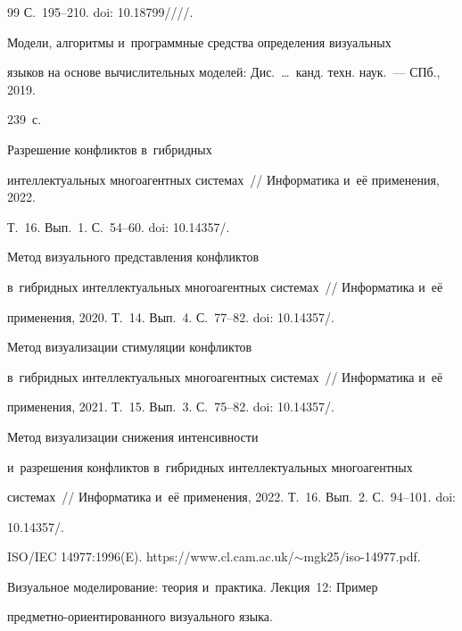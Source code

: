 {{\begin{thebibliography}{99}
С.~195--210. doi: 10.18799\!/\!/\!/\!/.




 Модели, алгоритмы и~программные средства определения визуальных 

языков на основе вычислительных моделей: Дис.\ \ldots\ канд. техн. наук.~--- СПб., 2019. 

239~с.


 Разрешение конфликтов в~гибридных 

интеллектуальных многоагентных системах~/\!\!/ Информатика и~её применения, 2022. 

Т.~16. Вып.~1. С.~54--60. doi: 10.14357\!/.


 Метод визуального представления конфликтов 

в~гибридных интеллектуальных многоагентных сис\-те\-мах~/\!\!/ Информатика и~её 

применения, 2020. Т.~14. Вып.~4. С.~77--82. doi: 10.14357\!/.


 Метод визуализации стимуляции конфликтов  

в~гиб\-рид\-ных интеллектуальных многоагентных сис\-те\-мах~/\!\!/ Информатика и~её 

применения, 2021. Т.~15. Вып.~3. С.~75--82. doi: 10.14357\!/.


 Метод визуализации снижения интенсивности 

и~разрешения конфликтов в~гиб\-рид\-ных интеллектуальных многоагентных  

сис\-те\-мах~/\!\!/ Информатика и~её применения, 2022. Т.~16. Вып.~2. С.~94--101. doi: 

10.14357\!/.


ISO/IEC 14977:1996(E). {\sf https://www.cl.cam.ac.uk/$\sim$mgk25/iso-14977.pdf}.


Визуальное моделирование: теория и~практика. Лекция~12: Пример  

пред\-мет\-но-ори\-ен\-ти\-ро\-ван\-но\-го визуального языка. {\sf 

}
\end{thebibliography}}}
